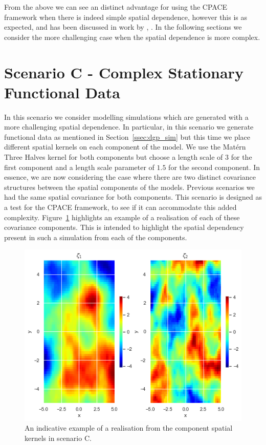 From the above we can see an distinct advantage for using the CPACE framework when there is indeed simple spatial dependence, however this is as expected, and has been discussed in work by \citeauthor{liu_functional_2017}, \citep{liu_functional_2017}.
In the following sections we consider the more challenging case when the spatial dependence is more complex.

\section{Scenario C - Complex Stationary Functional Data \label{sec:sim_C}}

In this scenario we consider modelling simulations which are generated with a more challenging spatial dependence.
In particular, in this scenario we generate functional data as mentioned in Section~\ref{ssec:dgp_sim} but this time we place different spatial kernels on each component of the model.
We use the Mat\'ern Three Halves kernel for both components but choose a length scale of $3$ for the first component and a length scale parameter of $1.5$ for the second component.
In essence, we are now considering the case where there are two distinct covariance structures between the spatial components of the models.
Previous scenarios we had the same spatial covariance for both components.
This scenario is designed as a test for the CPACE framework, to see if it can accommodate this added complexity.
Figure~\ref{fig:sim_example_C} highlights an example of a realisation of each of these covariance components. 
This is intended to highlight the spatial dependency present in such a simulation from each of the components.

\begin{figure}
	\centering
	\includegraphics[width=\textwidth]{sim_ex_zeta_C}
	\caption{An indicative example of a realisation from the component spatial kernels in scenario C.}
	\label{fig:sim_example_C}
\end{figure}

